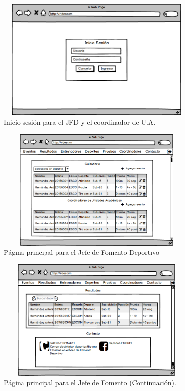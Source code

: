 		\begin{figure}[hbt!]
			\centering
			\includegraphics[width=10cm, height=6cm]{Imagenes/Nuevos/P1_LoginJFD_coord}
			\caption{Inicio sesión para el JFD y el coordinador de U.A.}
			\label{inicioJFDycoord}
		\end{figure}
		\pagebreak
		
		\begin{figure}[hbt!]
			\centering
			\includegraphics[width=10cm, height=6cm]{Imagenes/Nuevos/P2_Inicio_JefeFD}
			\caption{Página principal para el Jefe de Fomento Deportivo}
			\label{principalJFD}
		\end{figure}
	
		\begin{figure} [hbt!]
			\centering
			\includegraphics[width=10cm, height=6cm]{Imagenes/Nuevos/P3_Inicio_JefeFD1}
			\caption{Página principal para el Jefe de Fomento (Continuación).}
			\label{principalJFD1}
		\end{figure}
	
